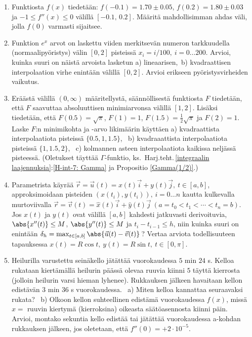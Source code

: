 \Harj
\begin{enumerate}

\item
Funktiosta $f(x)$ tiedetään: $f(-0.1)=1.70 \pm 0.05$, $f(0.2)=1.80 \pm 0.03$ ja
$-1 \le f''(x) \le 0$ välillä $[-0.1,\,0.2]$. Määritä mahdollisimman ahdas väli, jolla $f(0)$
varmasti sijaitsee.

\item
Funktion $e^x$ arvot on laskettu viiden merkitsevän numeron tarkkuudella (normaalipyöristys)
välin $[0,2]$ pisteissä $x_i=i/100,\ i=0 \ldots 200$. Arvioi, kuinka suuri on näistä
arvoista lasketun a) lineaarisen,\ b) kvadraattisen interpolaation virhe enintään välillä 
$[0,2]$. Arvioi erikseen pyöristysvirheiden vaikutus.

\item
Eräästä välillä $(0,\infty)$ määritellystä, säännöllisestä funktiosta $F$ tiedetään, että
$F$ saavuttaa absoluuttisen minimiarvonsa välillä $[1,2]$. Lisäksi tiedetään, että
$F(0.5)=\sqrt{\pi}$, $F(1)=1$, $F(1.5)=\frac{1}{2}\sqrt{\pi}$ ja $F(2)=1$. Laske $F$:n
minimikohta ja -arvo likimäärin käyttäen a) kvadraattista interpolaatiota pisteissä
$\{0.5,1,1.5\}$, \ b) kvadraaattista interpolaatiota pisteissä $\{1,1.5,2\}$, \ c) kolmannen
asteen interpolaatiota kaikissa neljässä pisteessä. (Oletukset täyttää $\Gamma$-funktio, ks.\
Harj.teht.\,\ref{integraalin laajennuksia}:\ref{H-int-7: Gamma} ja Propositio \ref{Gamma(1/2)}.)

\item
Parametrista käyrää $\vec r=\vec u(t)=x(t)\vec i+y(t)\vec j,\ t\in[a,b]$, approksimoidaan
pisteiden $(x(t_i),y(t_i)),\ i=0 \ldots n$ kautta kulkevalla murtoviivalla
$\vec r = \vec v(t)=\hat{x}(t)\vec i+\hat{y}(t)\vec j\ (a=t_0 < t_1 < \cdots < t_n = b)$. 
Jos $x(t)$ ja $y(t)$ ovat välillä $[a,b]$ kahdesti jatkuvasti derivoituvia, 
$\abs{x''(t)} \le M$, $\abs{y''(t)} \le M$ ja $t_i-t_{i-1} \le h$, niin kuinka suuri on
enintään $\delta_h=\max_{t\in[a,b]}\abs{\vec u(t)-\vec v(t)}$\,? Vertaa arviota todellisuuteen 
tapauksessa $x(t)=R\cos t,\ y(t)=R\sin t,\ t\in[0,\pi]$.

\item %
Heilurilla varustettu seinäkello jätättää vuorokaudessa $5$ min $24$ s. Kelloa
rukataan kiertämällä heilurin päässä olevaa ruuvia kiinni $5$ täyttä kierrosta (jolloin
heilurin varsi hieman lyhenee). Rukkauksen jälkeen havaitaan kellon edistävän $3$ min $36$ s
vuorokaudessa. \ a) Miten kelloa kannattaa seuraavaksi rukata? \ b) Olkoon kellon suhteellinen
edistämä vuorokaudessa $f(x)$, missä $x=$ ruuvin kiertymä (kierroksina) oikeasta säätöasennosta
kiinni päin. Arvioi, montako sekuntia kello edistää tai jätättää vuorokaudessa a-kohdan
rukkauksen jälkeen, jos oletetaan, että $f''(0)=+2 \cdot 10^{-5}$.


\end{enumerate}
